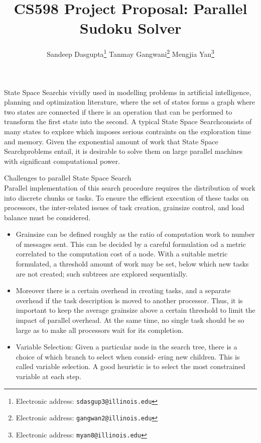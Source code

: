 \documentclass[10pt,twoside]{article}
\title{\textbf{ CS598 Project Proposal: Parallel Sudoku Solver}}
\author{Sandeep Dasgupta\thanks{Electronic address: \texttt{sdasgup3@illinois.edu}}
\qquad Tanmay Gangwani\thanks{Electronic address: \texttt{gangwan2@illinois.edu}}
\qquad  Mengjia Yan\thanks{Electronic address:
\texttt{myan8@illinois.edu}}}
\newcommand{\sps}{State Space Search}
\begin{document}
\thispagestyle{empty}

\maketitle
  \sps is vividly used in modelling problems in artificial intelligence, planning and optimization literature, where
  the set of states forms a graph where two states are connected if there is an operation that can be performed to transform the first state into the second.
  A typical \sps consists of many states to explore which imposes serious
  contraints on the exploration time and memory. Given the exponential amount
  of work that \sps problems entail, it is desirable to solve
  them on large parallel machines with significant computational power. 

  Challenges to parallel \sps \\
  Parallel implementation of this search procedure requires the distribution of
  work into discrete chunks or tasks. To ensure the efficient execution of
  these tasks on processors, the inter-related issues of task creation,
        grainsize control, and load balance must be considered. 
  \begin{itemize}        
    \item
          Grainsize can
          be defined roughly as the ratio of computation work to number of
          messages sent. This can be decided by a careful formulation od a
          metric correlated to the computation cost of a node. With a suitable
          metric formulated, a threshold amount of work may be set, below which
          new tasks are not created; such subtrees are explored sequentially.
     \item  
          Moreover there is a certain overhead in creating tasks, and a separate
          overhead if the task description is moved to another processor. Thus,
        it is important to keep the average grainsize above a certain threshold
          to limit the impact of parallel overhead. At the same time, no single
          task should be so large as to make all processors wait for its
          completion.

     \item
  Variable Selection:
  Given a particular node in the search tree, there is a choice of which branch to select when consid-
ering new children. This is called variable selection.
  A good heuristic is to select the most constrained variable at each step.
  \end{itemize}
\end{document}
